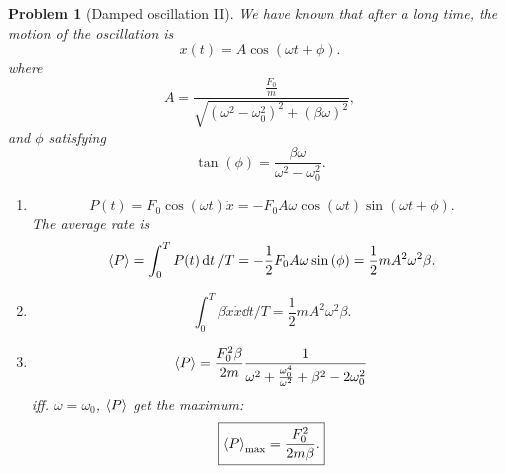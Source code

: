 \documentclass{article}
\theoremstyle{1}
\newtheorem{problem}{Problem}
\begin{document}
\begin{problem}[Damped oscillation II]
    We have known that after a long time, the motion of the oscillation is 
    \begin{equation}
        x(t)=A\cos\left(\omega t+\phi\right).
    \end{equation}
    where 
    \begin{equation}
        A=\frac{\frac{F_0}{m}}{\sqrt{\left(\omega^2-\omega_0^2\right)^2+\left(\beta\omega\right)^2}},
    \end{equation}
    and $\phi$ satisfying
    \begin{equation}
        \tan\left(\phi\right)=\frac{\beta\omega}{\omega^2-\omega_0^2}.
    \end{equation}
    \begin{enumerate}
        \item \begin{equation}
            P(t)=F_0\cos\left(\omega t \right)\dot{x}=-F_0A\omega\cos\left(\omega t\right)\sin\left(\omega t+\phi\right).
        \end{equation}
        The average rate is
        \begin{equation}
            \expval{P}=\int_{0}^{T}P(t)\dd{t}/T=-\frac{1}{2}F_0A\omega\sin\left(\phi\right)=\frac{1}{2}mA^2\omega^2\beta.
        \end{equation}
        \item \begin{equation}
            \int_{0}^{T}\beta\dot{x}\dot{x}\dd{t}/T=\frac{1}{2}mA^2\omega^2\beta.
        \end{equation}
        \item \begin{equation}
            \expval{P}=\frac{F_0^2\beta}{2m}\frac{1}{\omega^2+\frac{\omega_0^4}{\omega^2}+\beta^2-2\omega_0^2}
        \end{equation}
        iff. $\omega=\omega_0$, $\expval{P}$ get the maximum:
        \begin{equation}
            \boxed{\expval{P}_{\mathrm{max}}=\frac{F_0^2}{2m\beta}.}
        \end{equation}
    \end{enumerate}
\end{problem}
\end{document}
